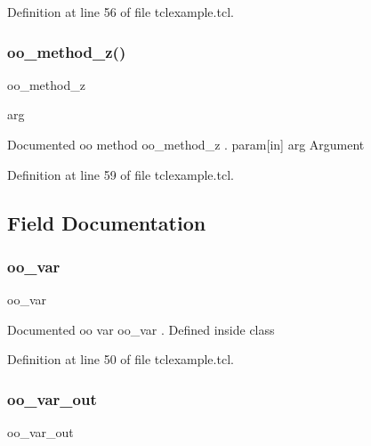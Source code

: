 Definition at line 56 of file tclexample.\+tcl.

\mbox{\label{classns_1_1oo__class_aa4571e8afadc9c5c0d0f45a5ffa4cecb}} 
\subsubsection{\texorpdfstring{oo\+\_\+method\+\_\+z()}{oo\_method\_z()}}
{\footnotesize\ttfamily oo\+\_\+method\+\_\+z\begin{DoxyParamCaption}\item[{}]{arg  }\end{DoxyParamCaption}}

Documented oo method {\ttfamily oo\+\_\+method\+\_\+z} . param\mbox{[}in\mbox{]} arg Argument 

Definition at line 59 of file tclexample.\+tcl.



\subsection{Field Documentation}
\mbox{\label{classns_1_1oo__class_a0db9c0f77e13b0938595c27ae93fc47d}} 
\subsubsection{\texorpdfstring{oo\+\_\+var}{oo\_var}}
{\footnotesize\ttfamily oo\+\_\+var\hspace{0.3cm}{\ttfamily [static]}}

Documented oo var {\ttfamily oo\+\_\+var} . Defined inside class 

Definition at line 50 of file tclexample.\+tcl.

\mbox{\label{classns_1_1oo__class_ab81ae08f4b693af6731d12ee2827971b}} 
\subsubsection{\texorpdfstring{oo\+\_\+var\+\_\+out}{oo\_var\_out}}
{\footnotesize\ttfamily oo\+\_\+var\+\_\+out\hspace{0.3cm}{\ttfamily [static]}}

